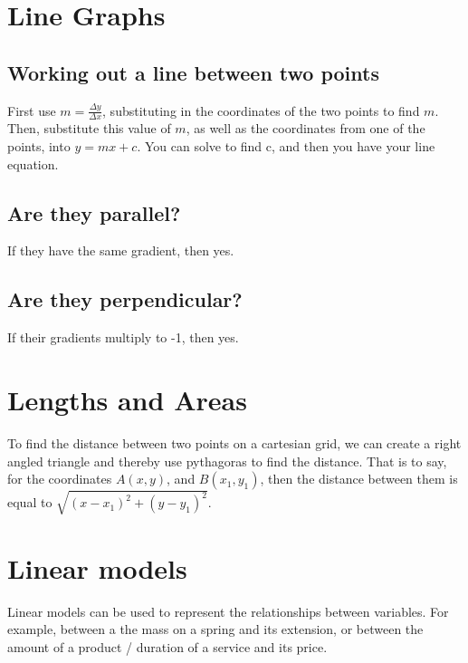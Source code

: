 \section{Line Graphs}
\subsection{Working out a line between two points}
First use $m=\frac{\Delta y}{\Delta x}$, substituting in the coordinates of the two points to find $m$. Then, substitute this value of $m$, as well as the coordinates from one of the points, into $y=mx+c$. You can solve to find c, and then you have your line equation.
\subsection{Are they parallel?}
If they have the same gradient, then yes.
\subsection{Are they perpendicular?}
If their gradients multiply to -1, then yes.

\section{Lengths and Areas}
To find the distance between two points on a cartesian grid, we can create a right angled triangle and thereby use pythagoras to find the distance. That is to say, for the coordinates $A (x, y)$, and $B (x_1, y_1)$, then the distance between them is equal to $\sqrt{(x-x_1)^2+(y-y_1)^2}$.


\section{Linear models}
Linear models can be used to represent the relationships between variables. For example, between a the mass on a spring and its extension, or between the amount of a product / duration of a service and its price.

